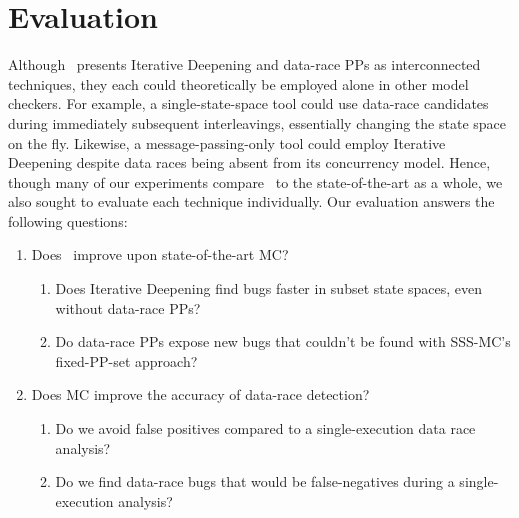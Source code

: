 \section{Evaluation}
\label{sec:eval}

Although \quicksand~presents Iterative Deepening and data-race PPs as interconnected techniques, they each could theoretically be employed alone in other model checkers.
For example, a single-state-space tool could use data-race candidates during immediately subsequent interleavings, essentially changing the state space on the fly.
Likewise, a message-passing-only tool could employ Iterative Deepening despite data races being absent from its concurrency model.
Hence, though many of our experiments compare \quicksand~to the state-of-the-art as a whole,
we also sought to evaluate each technique individually.
Our evaluation answers the following questions:
\begin{enumerate}

	\item Does \quicksand~improve upon state-of-the-art MC?
		\begin{enumerate}
			\item Does Iterative Deepening find bugs faster
				in subset state spaces, even without data-race PPs?
			\item Do data-race PPs expose new bugs that couldn't be found with SSS-MC's fixed-PP-set approach?
		\end{enumerate}
	\item Does MC improve the accuracy of data-race detection?
		\begin{enumerate}
			\item Do we avoid false positives compared to a single-execution data race analysis?
			\item Do we find data-race bugs that would be false-negatives during a single-execution analysis?%
		\end{enumerate}
\end{enumerate}

